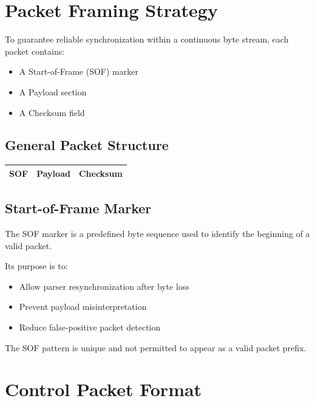 \section{Packet Framing Strategy}

To guarantee reliable synchronization within a continuous byte stream, each packet contains:

\begin{itemize}
	\item A Start-of-Frame (SOF) marker
	\item A Payload section
	\item A Checksum field
\end{itemize}

\subsection{General Packet Structure}

\begin{center}
	\begin{tabular}{|c|c|c|}
		\hline
		SOF & Payload & Checksum \\
		\hline
	\end{tabular}
\end{center}

\subsection{Start-of-Frame Marker}

The SOF marker is a predefined byte sequence used to identify the beginning of a valid packet.  

Its purpose is to:

\begin{itemize}
	\item Allow parser resynchronization after byte loss
	\item Prevent payload misinterpretation
	\item Reduce false-positive packet detection
\end{itemize}

The SOF pattern is unique and not permitted to appear as a valid packet prefix.


\section{Control Packet Format}

